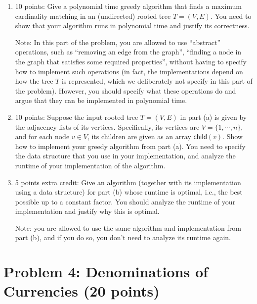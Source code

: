 \documentclass[12pt]{article}
\begin{document}
\begin{enumerate}
    \item [(a)] 10 points: Give a polynomial time greedy algorithm that finds a maximum cardinality matching in an (undirected) rooted tree $T = (V,E)$. You need to show that your algorithm runs in polynomial time and justify its correctness. 
    
    Note: In this part of the problem, you are allowed to use ``abstract'' operations, such as ``removing an edge from the graph'', ``finding a node in the graph that satisfies some required properties'', without having to specify how to implement such operations (in fact, the implementations depend on how the tree $T$ is represented, which we deliberately not specify in this part of the problem). However, you should specify what these operations do and argue that they can be implemented in polynomial time. 

    \item [(b)] 10 points: Suppose the input rooted tree $T = (V,E)$ in part (a) is given by the adjacency lists of its vertices. Specifically, its vertices are $V = \{1, \cdots, n\}$, and for each node $v \in V$, its children are given as an array $\mathsf{child}(v)$. Show how to implement your greedy algorithm from part (a). You need to specify the data structure that you use in your implementation, and analyze the runtime of your implementation of the algorithm. 

    \item [(c)] 5 points extra credit: Give an algorithm (together with its implementation using a data structure) for part (b) whose runtime is optimal, i.e., the best possible up to a constant factor. You should analyze the runtime of your implementation and justify why this is optimal. 
    
    Note: you are allowed to use the same algorithm and implementation from part (b), and if you do so, you don't need to analyze its runtime again.   
\end{enumerate}




\vspace{5mm}
\section*{Problem 4: Denominations of Currencies (20 points)}
\end{document}
